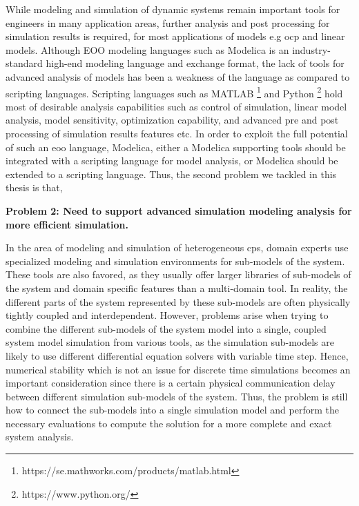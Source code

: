 While modeling and simulation of dynamic systems remain important tools for engineers in many application areas, further analysis and post processing for simulation results is required, for most applications of models e.g \acrshort{ocp} and linear models. Although EOO modeling languages such as Modelica is an industry-standard high-end modeling language and exchange format, the lack of tools for advanced analysis of models has been a weakness of the language as compared to scripting languages. Scripting languages such as MATLAB \footnote{https://se.mathworks.com/products/matlab.html} and Python \footnote{https://www.python.org/} hold most of desirable analysis capabilities such as control of simulation, linear model analysis, model sensitivity, optimization capability, and advanced pre and post processing of simulation results features etc. In order to exploit the full potential of such an \acrshort{eoo} language, Modelica, either a Modelica supporting tools should be integrated with a scripting language for model analysis, or Modelica should be extended to a scripting language. Thus, the second problem we tackled in this thesis is that,

\begin{description}

\item \textbf{Problem 2: Need to support advanced simulation modeling analysis for more efficient simulation.}

\end{description}

In the area of modeling and simulation of heterogeneous \acrshort{cps}, domain experts use specialized modeling and simulation environments for sub-models of the system. These tools are also favored, as they usually offer larger libraries of sub-models of the system and domain specific features than a multi-domain tool. In reality, the different parts of the system represented by these sub-models are often physically tightly coupled and interdependent. However, problems arise when trying to combine the different sub-models of the system model into a single, coupled system model simulation from various tools, as the simulation sub-models are likely to use different differential equation solvers with variable time step. Hence, numerical stability which is not an issue for discrete time simulations becomes an important consideration since there is a certain physical communication delay between different simulation sub-models of the system. Thus, the problem is still how to connect the sub-models into a single simulation model and perform the necessary evaluations to compute the solution for a more complete and exact system analysis. 

